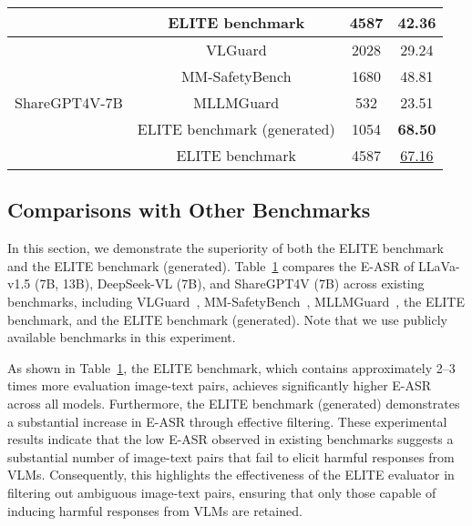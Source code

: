 \begin{table}[t!]
\begin{center}
{\begin{tabular}{cccc}
\multicolumn{1}{c|}{}                                & ELITE benchmark  & 4587 & \textbf{42.36}  \\ \midrule
\multicolumn{1}{c|}{\multirow{5}{*}{ShareGPT4V-7B}} & VLGuard        & 2028          & 29.24           \\
\multicolumn{1}{c|}{}                                & MM-SafetyBench & 1680          & 48.81          \\
\multicolumn{1}{c|}{}                                & MLLMGuard      & 532           & 23.51           \\
\multicolumn{1}{c|}{}                                & ELITE benchmark (generated)  & 1054 & \textbf{68.50} \\ 
\multicolumn{1}{c|}{}                                & ELITE benchmark   & 4587 & \underline{67.16} \\ \bottomrule
\end{tabular}}
\label{table4}
\end{center}
\end{table}


\subsection{Comparisons with Other Benchmarks}
In this section, we demonstrate the superiority of both the ELITE benchmark and the ELITE benchmark (generated). 
Table~\ref{table4} compares the E-ASR of LLaVa-v1.5 (7B, 13B), DeepSeek-VL (7B), and ShareGPT4V (7B) across existing benchmarks, including VLGuard~\cite{vlguard2024}, MM-SafetyBench~\cite{mmsafetybench2025}, MLLMGuard~\cite{mllmguard2024}, the ELITE benchmark, and the ELITE benchmark (generated). Note that we use publicly available benchmarks in this experiment. 

As shown in Table~\ref{table4}, the ELITE benchmark, which contains approximately 2–3 times more evaluation image-text pairs, achieves significantly higher E-ASR across all models. Furthermore, the ELITE benchmark (generated) demonstrates a substantial increase in E-ASR through effective filtering. These experimental results indicate that the low E-ASR observed in existing benchmarks suggests a substantial number of image-text pairs that fail to elicit harmful responses from VLMs. Consequently, this highlights the effectiveness of the ELITE evaluator in filtering out ambiguous image-text pairs, ensuring that only those capable of inducing harmful responses from VLMs are retained.


